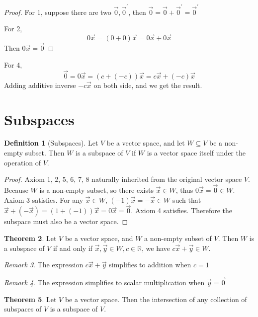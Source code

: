 \documentclass{article}
\theoremstyle{definition}
\newtheorem{theorem}{Theorem}[section]
\newtheorem{definition}[theorem]{Definition}
\theoremstyle{remark}
\newtheorem{remark}[theorem]{Remark}
\begin{document}
\begin{proof}
For 1, suppose there are two $\vec{0},\vec{0}^{'}$, then $\vec{0}=\vec{0}+\vec{0}^{'}=\vec{0}^{'}$

For 2, 
\[
0\vec{x}=(0+0)\vec{x}=0\vec{x}+0\vec{x}
\]
Then $0\vec{x}=\vec{0}$
\end{proof}

For 4, 
\[
\vec{0}=0\vec{x}=(c+(-c))\vec{x}=c\vec{x}+(-c)\vec{x}
\]
Adding additive inverse $-c\vec{x}$ on both side, and we get the result.

\section{Subspaces}
\begin{definition}[Subspaces]
Let $V$ be a vector space, and let $W \subseteq V$ be a non-empty subset. Then $W$ is a subspace of $V$ if $W$ is a vector space itself under the operation of $V$.
\end{definition}

\begin{proof}
Axiom 1, 2, 5, 6, 7, 8 naturally inherited from the original vector space $V$.
Because $W$ is a non-empty subset, so there exists $\vec{x}\in W$, thus $0\vec{x}=\vec{0}\in W$. Axiom 3 satisfies.
For any $\vec{x}\in W$, $(-1)\vec{x}=-\vec{x}\in W$ such that $\vec{x}+(-\vec{x})=(1+(-1))\vec{x}=0\vec{x}=\vec{0}$. Axiom 4 satisfies.
Therefore the subspace must also be a vector space.
\end{proof}

\begin{theorem}
Let $V$ be a vector space, and $W$ a non-empty subset of $V$. Then $W$ is a subspace of $V$ if and only if $\vec{x},\vec{y}\in W, c\in\mathbb{R}$, we have $c\vec{x}+\vec{y}\in W$.
\end{theorem}

\begin{remark}
The expression $c\vec{x}+\vec{y}$ simplifies to addition when $c=1$
\end{remark}

\begin{remark}
The expression simplifies to scalar multiplication when $\vec{y}=\vec{0}$
\end{remark}

\begin{theorem}
Let $V$ be a vector space. Then the intersection of any collection of subspaces of $V$ is a subspace of $V$.
\end{theorem}
\end{document}
